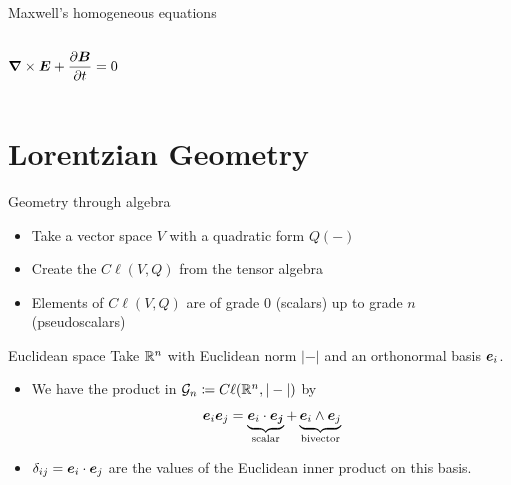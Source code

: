 \documentclass[aspectratio=169]{beamer}
\begin{document}
\begin{frame}{Maxwell's homogeneous equations}
\begin{columns}[c]
\begin{center}
    \vspace{-8mm}
    
    \small
    $$ \boldsymbol{\nabla} \times \boldsymbol{E} + \frac{\partial \boldsymbol{B}}{\partial t} = 0 $$ 
    \normalsize
    
    \end{center}
   
    
    \end{columns}
    
    
\end{frame}

\section{Lorentzian Geometry}

\begin{frame}{Geometry through algebra}
\vfill
\begin{itemize}
	\item Take a vector space $V$ with a quadratic form $Q(-)$
	\item Create the  $C\ell(V,Q)$ from the tensor algebra
	\item Elements of $C\ell(V,Q)$ are  of grade 0 (scalars) up to grade $n$ (pseudoscalars)
\end{itemize}
\vfill
\end{frame}

\begin{frame}{Euclidean space}
\vfill
Take $\mathbb{R}^n$ with Euclidean norm $|-|$ and an orthonormal basis $\boldsymbol{e}_i$.
\begin{itemize}
	\item We have the product in $\mathcal{G}_n\coloneqq C\ell(\mathbb{R}^n,|-|)$ by
	\[
	\boldsymbol{e}_i \boldsymbol{e}_j = \underbrace{\boldsymbol{e}_i \cdot \boldsymbol{e_j}}_{\textrm{scalar}} + \underbrace{\boldsymbol{e}_i \wedge \boldsymbol{e}_j}_{\textrm{bivector}}
	\]
	\item $\delta_{ij}=\boldsymbol{e}_i\cdot \boldsymbol{e}_j$ are the values of the Euclidean inner product on this basis.
\end{itemize}
\vfill
\end{frame}
\end{document}
